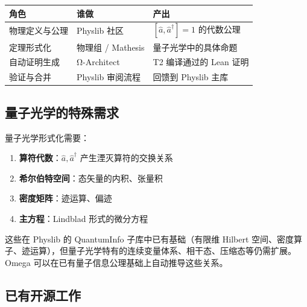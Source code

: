 \documentclass[
  11pt,
  a4paper,
]{ctexrep}
\newcounter{none} %
\providecommand{\tightlist}{%
  \setlength{\itemsep}{0pt}\setlength{\parskip}{0pt}}
\begin{document}
{\def\LTcaptype{none} %
\begin{longtable}[]{@{}
  >{\raggedright\arraybackslash}p{}
  >{\raggedright\arraybackslash}p{}
  >{\raggedright\arraybackslash}p{}@{}}
\toprule\noalign{}
\begin{minipage}[b]{\linewidth}\raggedright
角色
\end{minipage} & \begin{minipage}[b]{\linewidth}\raggedright
谁做
\end{minipage} & \begin{minipage}[b]{\linewidth}\raggedright
产出
\end{minipage} \\
\midrule\noalign{}
\endhead
\bottomrule\noalign{}
\endlastfoot
物理定义与公理 & Physlib 社区 & \([\hat{a}, \hat{a}^\dagger] = 1\)
的代数公理 \\
定理形式化 & 物理组 / Mathesis & 量子光学中的具体命题 \\
自动证明生成 & Ω-Architect & T2 编译通过的 Lean 证明 \\
验证与合并 & Physlib 审阅流程 & 回馈到 Physlib 主库 \\
\end{longtable}
}

\subsection{量子光学的特殊需求}\label{ux91cfux5b50ux5149ux5b66ux7684ux7279ux6b8aux9700ux6c42}

量子光学形式化需要：

\begin{enumerate}
\def\labelenumi{\arabic{enumi}.}
\tightlist
\item
  \textbf{算符代数}：\(\hat{a}, \hat{a}^\dagger\) 产生湮灭算符的交换关系
\item
  \textbf{希尔伯特空间}：态矢量的内积、张量积
\item
  \textbf{密度矩阵}：迹运算、偏迹
\item
  \textbf{主方程}：Lindblad 形式的微分方程
\end{enumerate}

这些在 Physlib 的 QuantumInfo 子库中已有基础（有限维 Hilbert
空间、密度算子、迹运算），但量子光学特有的连续变量体系、相干态、压缩态等仍需扩展。Omega
可以在已有量子信息公理基础上自动推导这些关系。

\subsection{已有开源工作}\label{ux5df2ux6709ux5f00ux6e90ux5de5ux4f5c}
\end{document}
